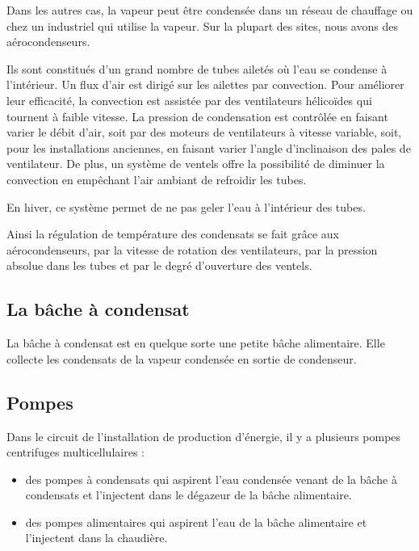 Dans les autres cas, la vapeur peut être condensée dans un réseau de chauffage ou chez un industriel qui utilise la vapeur.
Sur la plupart des sites, nous avons des aérocondenseurs.



Ils sont constitués d’un grand nombre de tubes ailetés où l’eau se condense à l’intérieur.
Un flux d’air est dirigé sur les ailettes par convection. Pour améliorer leur efficacité, la convection est assistée par des ventilateurs hélicoïdes qui tournent à faible vitesse. La pression de condensation est contrôlée en faisant varier le débit d’air, soit par des moteurs de ventilateurs à vitesse variable, soit, pour les installations anciennes, en faisant varier l’angle d’inclinaison des pales de ventilateur. De plus, un système de ventels offre la possibilité de diminuer la convection en empêchant l’air ambiant de refroidir les tubes.
\vspace{0.3cm}

En hiver, ce système permet de ne pas geler l’eau à l’intérieur des tubes.
\vspace{0.3cm}

Ainsi la régulation de température des condensats se fait grâce aux aérocondenseurs, par la vitesse de rotation des ventilateurs, par la pression absolue dans les tubes et par le degré d’ouverture des ventels.


\subsection{La bâche à condensat}

La bâche à condensat est en quelque sorte une petite bâche alimentaire. Elle collecte les condensats de la vapeur condensée en sortie de condenseur.


\subsection{Pompes}

Dans le circuit de l’installation de production d’énergie, il y a plusieurs pompes centrifuges multicellulaires :
\begin{itemize}
\item des pompes à condensats qui aspirent l’eau condensée venant de la bâche à condensats et l’injectent dans le dégazeur de la bâche alimentaire.
\item  des pompes alimentaires qui aspirent l’eau de la bâche alimentaire et l’injectent dans la chaudière.
\end{itemize}

